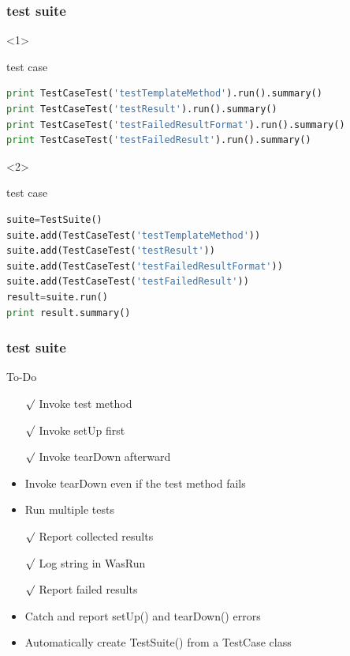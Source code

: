 \documentclass[lualatex]{beamer}
\begin{document}
\begin{frame}[fragile,t]
    \frametitle{test suite}

        \small
        \begin{onlyenv}<1>
            \begin{block}{test case}
                \begin{lstlisting}[language=Python,columns=fullflexible]
print TestCaseTest('testTemplateMethod').run().summary()                    
print TestCaseTest('testResult').run().summary()                    
print TestCaseTest('testFailedResultFormat').run().summary()                    
print TestCaseTest('testFailedResult').run().summary()                    
                \end{lstlisting}
            \end{block}
        \end{onlyenv}

        \begin{onlyenv}<2>
            \begin{block}{test case}
                \begin{lstlisting}[language=Python,columns=fullflexible]
suite=TestSuite()
suite.add(TestCaseTest('testTemplateMethod'))
suite.add(TestCaseTest('testResult'))
suite.add(TestCaseTest('testFailedResultFormat'))
suite.add(TestCaseTest('testFailedResult'))
result=suite.run()
print result.summary()
                \end{lstlisting}
            \end{block}
        \end{onlyenv}
\end{frame}

\begin{frame}
    \frametitle{test suite}

    \begin{block}{To-Do}
        \begin{itemize}
            \item[$\surd$] Invoke test method
            \item[$\surd$] Invoke setUp first 
            \item[$\surd$] Invoke tearDown afterward 
            \item Invoke tearDown even if the test method fails 
            \item Run multiple tests 
            \item[$\surd$] Report collected results 
            \item[$\surd$] Log string in WasRun 
            \item[$\surd$] Report failed results
            \item Catch and report setUp() and tearDown() errors
            \item Automatically create TestSuite() from a TestCase class
        \end{itemize}
    \end{block}
\end{frame}
\end{document}
